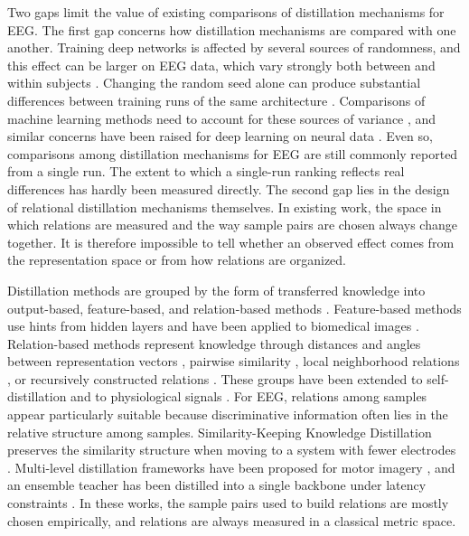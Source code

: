Two gaps limit the value of existing comparisons of distillation
mechanisms for EEG. The first gap concerns how distillation mechanisms are compared with one another.
Training deep networks is affected by several sources of randomness, and
this effect can be larger on EEG data, which vary strongly both between
and within subjects \cite{huang2023discrepancy}. Changing the random seed
alone can produce substantial differences between training runs of the
same architecture \cite{picard2021torch}. Comparisons of machine learning
methods need to account for these sources of variance
\cite{bouthillier2021accounting}, and similar concerns have been raised for
deep learning on neural data \cite{delpup2024toward}. Even so, comparisons
among distillation mechanisms for EEG are still commonly reported from a
single run. The extent to which a single-run ranking reflects real
differences has hardly been measured directly. The second gap lies in the design of relational distillation mechanisms themselves. In existing work, the
space in which relations are measured and the way sample pairs are chosen
always change together. It is therefore impossible to tell whether an
observed effect comes from the representation space or from how relations
are organized.

Distillation methods are grouped by the form of transferred knowledge
into output-based, feature-based, and relation-based methods
\cite{gou2021knowledge, mansourian2025comprehensive}. Feature-based
methods use hints from hidden layers \cite{romero2015fitnets} and have
been applied to biomedical images \cite{javed2023knowledge}.
Relation-based methods represent knowledge through distances and angles
between representation vectors \cite{park2019relational}, pairwise
similarity \cite{feng2021double}, local neighborhood relations
\cite{gou2025neighborhood}, or recursively constructed relations
\cite{ye2021unsupervised}. These groups have been extended to self-distillation
\cite{zhang2022selfdistillation, mai2025eegskdnet} and to physiological
signals \cite{wang2021fldnet, gu2023framelevel, zhang2023distilling,
ibrahim2022knowledge, garcia-salinas2023intrasubject}. For EEG, relations among samples appear particularly
suitable because discriminative information often lies in the relative
structure among samples. Similarity-Keeping Knowledge Distillation preserves the similarity
structure when moving to a system with fewer electrodes
\cite{huang2024enhancing}. Multi-level distillation frameworks have been
proposed for motor imagery \cite{wu2026multilevel}, and an ensemble teacher
has been distilled into a single backbone under latency constraints
\cite{xu2026entropy}. In these works, the sample pairs used to
build relations are mostly chosen empirically, and relations are always
measured in a classical metric space.

